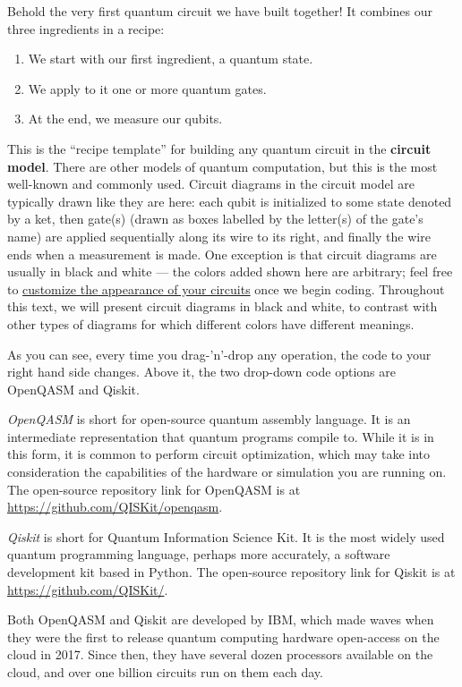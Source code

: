 \documentclass{article}
\theoremstyle{definition}
\begin{document}
Behold the very first quantum circuit we have built together!  It combines our three ingredients in a recipe:
\begin{enumerate}
	\item We start with our first ingredient, a quantum state.
	\item We apply to it one or more quantum gates.
	\item At the end, we measure our qubits.
\end{enumerate}
This is the ``recipe template'' for building any quantum circuit in the \textbf{circuit model}.  There are other models of quantum computation, but this is the most well-known and commonly used.  Circuit diagrams in the circuit model are typically drawn like they are here: each qubit is initialized to some state denoted by a ket, then gate(s) (drawn as boxes labelled by the letter(s) of the gate's name) are applied sequentially along its wire to its right, and finally the wire ends when a measurement is made.  One exception is that circuit diagrams are usually in black and white --- the colors added shown here are arbitrary; feel free to \href{https://medium.com/qiskit/learn-how-to-customize-the-appearance-of-your-qiskit-circuits-with-accessibility-in-mind-b9b59fc039f3}{customize the appearance of your circuits} once we begin coding.  Throughout this text, we will present circuit diagrams in black and white, to contrast with other types of diagrams for which different colors have different meanings.

As you can see, every time you drag-'n'-drop any operation, the code to your right hand side changes.  Above it, the two drop-down code options are OpenQASM and Qiskit.

\textit{OpenQASM} is short for open-source quantum assembly language.  It is an intermediate representation that quantum programs compile to.  While it is in this form, it is common to perform circuit optimization, which may take into consideration the capabilities of the hardware or simulation you are running on.  The open-source repository link for OpenQASM is at \url{https://github.com/QISKit/openqasm}.

\textit{Qiskit} is short for Quantum Information Science Kit.  It is the most widely used quantum programming language, perhaps more accurately, a software development kit based in Python.  The open-source repository link for Qiskit is at \url{https://github.com/QISKit/}.

Both OpenQASM and Qiskit are developed by IBM, which made waves when they were the first to release quantum computing hardware open-access on the cloud in 2017.  Since then, they have several dozen processors available on the cloud, and over one billion circuits run on them each day.
\end{document}
